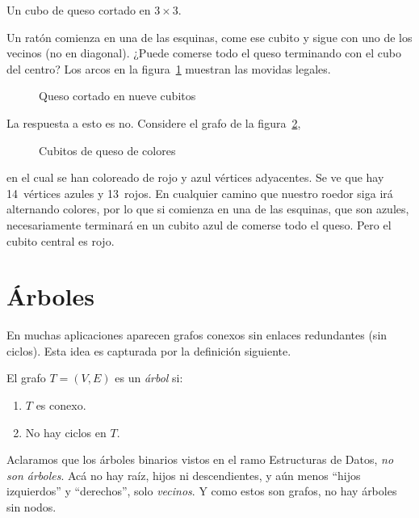   \begin{example}
    \label{ex:queso}
    Un cubo de queso cortado en \(3 \times 3\).

    Un ratón comienza en una de las esquinas,
    come ese cubito y sigue con uno de los vecinos (no en diagonal).
    ¿Puede comerse todo el queso terminando con el cubo del centro?
    Los arcos en la figura~\ref{fig:cubo-queso}
    muestran las movidas legales.
    \begin{figure}[htbp]
      \centering
      \caption{Queso cortado en nueve cubitos}
      \label{fig:cubo-queso}
    \end{figure}

    La respuesta a esto es no.
    Considere el grafo de la figura~\ref{fig:cubo-queso-bipartito},
    \begin{figure}[htbp]
      \centering
      \caption{Cubitos de queso de colores}
      \label{fig:cubo-queso-bipartito}
    \end{figure}
    en el cual se han coloreado de rojo y azul vértices adyacentes.
    Se ve que hay 14~vértices azules y 13~rojos.
    En cualquier camino que nuestro roedor siga
    irá alternando colores,
    por lo que si comienza en una de las esquinas,
    que son azules,
    necesariamente terminará en un cubito azul
    de comerse todo el queso.
    Pero el cubito central es rojo.
  \end{example}

\section{Árboles}
\label{sec:arboles}

  En muchas aplicaciones aparecen grafos conexos
  sin enlaces redundantes
  (sin ciclos).
  Esta idea es capturada por la definición siguiente.
  \begin{definition}
    El grafo \(T = (V, E)\) es un \emph{árbol} si:
    \begin{enumerate}[label=\textbf{T\arabic{*}:}, ref=T\arabic{*}]
    \item
      \label{T:conexo}
      \(T\) es conexo.
    \item
      \label{T:aciclico}
      No hay ciclos en \(T\).
    \end{enumerate}
  \end{definition}
  Aclaramos que los árboles binarios%
  vistos en el ramo Estructuras de Datos,
  \emph{no son árboles}.
  Acá no hay raíz,
  hijos ni descendientes,
  y aún menos ``hijos izquierdos'' y ``derechos'',
  solo \emph{vecinos}.
  Y como estos son grafos,
  no hay árboles sin nodos.


